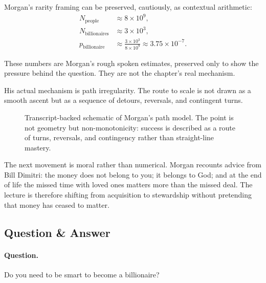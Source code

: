 Morgan's rarity framing can be preserved, cautiously, as contextual arithmetic:
\begin{align}
N_{\mathrm{people}} &\approx 8\times 10^9,\\
N_{\mathrm{billionaires}} &\approx 3\times 10^3,\\
p_{\mathrm{billionaire}}
&\approx
\frac{3\times 10^3}{8\times 10^9}
\approx 3.75\times 10^{-7}.
\end{align}

\begin{remark}
These numbers are Morgan's rough spoken estimates, preserved only to show the pressure behind the question. They are not the chapter's real mechanism.
\end{remark}

His actual mechanism is path irregularity. The route to scale is not drawn as a smooth ascent but as a sequence of detours, reversals, and contingent turns.

\begin{figure}[h]
\centering
{}
\caption{Transcript-backed schematic of Morgan's path model. The point is not geometry but non-monotonicity: success is described as a route of turns, reversals, and contingency rather than straight-line mastery.}
\end{figure}

The next movement is moral rather than numerical. Morgan recounts advice from Bill Dimitri: the money does not belong to you; it belongs to God; and at the end of life the missed time with loved ones matters more than the missed deal. The lecture is therefore shifting from acquisition to stewardship without pretending that money has ceased to matter.

\subsection{Question \& Answer}

\paragraph{Question.}
Do you need to be smart to become a billionaire?

